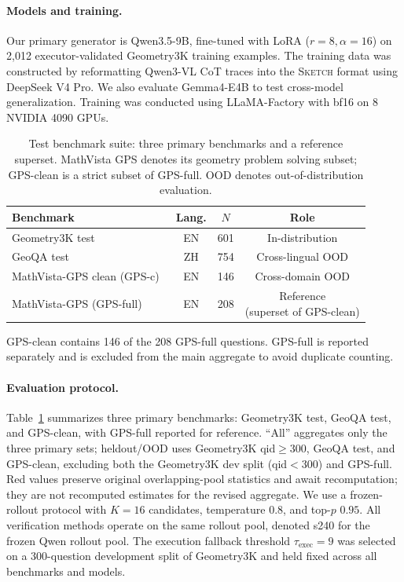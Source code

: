 \documentclass{article}
\newcommand{\sketch}{\textsc{Sketch}}
\begin{document}
\paragraph{Models and training.} Our primary generator is Qwen3.5-9B, fine-tuned with LoRA ($r{=}8, \alpha{=}16$) on 2,012 executor-validated Geometry3K training examples. The training data was constructed by reformatting Qwen3-VL CoT traces into the \sketch{} format using DeepSeek V4 Pro. We also evaluate Gemma4-E4B to test cross-model generalization. Training was conducted using LLaMA-Factory with bf16 on 8 NVIDIA 4090 GPUs.

\begin{table}[h]
\centering
\caption{Test benchmark suite: three primary benchmarks and a reference superset. MathVista GPS denotes its geometry problem solving subset; GPS-clean is a strict subset of GPS-full. OOD denotes out-of-distribution evaluation.}
\label{tab:benchmarks}
\small
\begin{tabular}{lccc}
\toprule
Benchmark & Lang. & $N$ & Role \\
\midrule
Geometry3K test~\citep{lu2021inter} & EN & 601 & In-distribution \\
GeoQA test~\citep{chen2021geoqa} & ZH & 754 & Cross-lingual OOD \\
MathVista-GPS clean (GPS-c)~\citep{lu2023mathvista} & EN & 146 & Cross-domain OOD \\
MathVista-GPS (GPS-full)~\citep{lu2023mathvista} & EN & 208 & \shortstack{Reference\\(superset of GPS-clean)} \\
\bottomrule
\end{tabular}
\par\smallskip
\begin{minipage}{\linewidth}\footnotesize
GPS-clean contains 146 of the 208 GPS-full questions. GPS-full is reported separately and is excluded from the main aggregate to avoid duplicate counting.
\end{minipage}
\end{table}

\paragraph{Evaluation protocol.} Table~\ref{tab:benchmarks} summarizes three primary benchmarks: Geometry3K test, GeoQA test, and GPS-clean, with GPS-full reported for reference. ``All'' aggregates only the three primary sets; heldout/OOD uses Geometry3K qid$\geq300$, GeoQA test, and GPS-clean, excluding both the Geometry3K dev split (qid$<300$) and GPS-full. Red values preserve original overlapping-pool statistics and await recomputation; they are not recomputed estimates for the revised aggregate. We use a frozen-rollout protocol with $K{=}16$ candidates, temperature $0.8$, and top-$p$ $0.95$. All verification methods operate on the same rollout pool, denoted s240 for the frozen Qwen rollout pool. The execution fallback threshold $\tau_{\text{exec}}{=}9$ was selected on a 300-question development split of Geometry3K and held fixed across all benchmarks and models.
\end{document}
